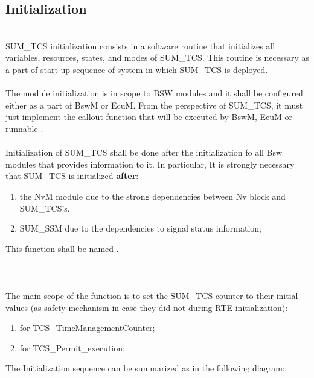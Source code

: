 \subsection{Initialization}
\label{subsec:tcsInit}
\\
SUM\_TCS initialization consists in a software routine that initializes all variables, resources, states, and modes of SUM\_TCS. This routine is necessary as a part of start-up sequence of system in which SUM\_TCS
is deployed. 
\\
\\
The module initialization is in scope to BSW modules and it shall be configured either as a part of BswM or EcuM. From the perspective of SUM\_TCS, it must just implement the callout function that will be executed by BswM, EcuM or runnable .
\\
\\
Initialization of SUM\_TCS shall be done after the initialization fo all Bsw modules that provides information to it. In particular, It is strongly necessary that SUM\_TCS is initialized
\textbf{after}:
\begin{enumerate}
	\item the NvM module due to the strong dependencies between Nv block and SUM\_TCS's.
	\item SUM\_SSM due to the dependencies to signal status information;
\end{enumerate}

This function shall be named .
\\
{  }
\\
\\
\\
The main scope of the function is to set the SUM\_TCS counter to their initial values (as safety mechanism in case they did not during RTE initialization):
\begin{enumerate}
	\item {} for TCS_TimeManagementCounter;
	\item {} for TCS_Permit_execution;
\end{enumerate}

The Initialization sequence can be summarized as in the following diagram:
{  }


